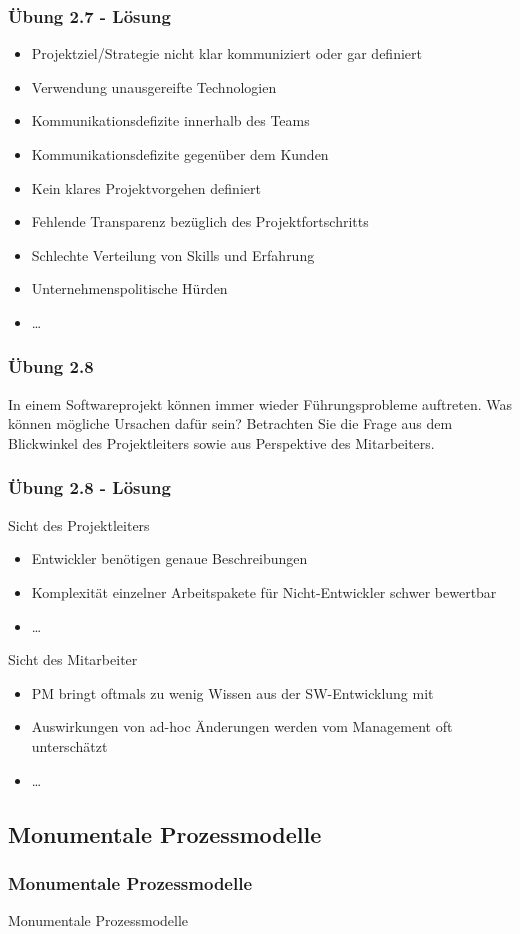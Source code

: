 \ifloesung
\begin{frame}[fragile]
\frametitle{Übung 2.7 - Lösung}
	\begin{itemize}
		\item Projektziel/Strategie nicht klar kommuniziert oder gar definiert
		\item Verwendung unausgereifte Technologien
		\item Kommunikationsdefizite innerhalb des Teams
		\item Kommunikationsdefizite gegenüber dem Kunden
		\item Kein klares Projektvorgehen definiert
		\item Fehlende Transparenz bezüglich des Projektfortschritts
		\item Schlechte Verteilung von Skills und Erfahrung
		\item Unternehmenspolitische Hürden
		\item \ldots
	\end{itemize}
\end{frame}
\fi

\begin{frame}
\frametitle{Übung 2.8}
	In einem Softwareprojekt können immer wieder Führungsprobleme auftreten.
	Was können mögliche Ursachen dafür sein? Betrachten Sie die Frage aus dem
	Blickwinkel des Projektleiters sowie aus Perspektive des Mitarbeiters.
\end{frame}

\ifloesung
\begin{frame}[fragile]
\frametitle{Übung 2.8 - Lösung}
	Sicht des Projektleiters
	\begin{itemize}
		\item Entwickler benötigen genaue Beschreibungen
		\item Komplexität einzelner Arbeitspakete für Nicht-Entwickler schwer
		bewertbar
		\item \ldots
	\end{itemize}
	\bigskip
	Sicht des Mitarbeiter
	\begin{itemize}
		\item PM bringt oftmals zu wenig Wissen aus der SW-Entwicklung
		mit
		\item Auswirkungen von ad-hoc Änderungen werden vom Management oft
		unterschätzt
		\item \ldots
	\end{itemize}
\end{frame}
\fi

\subsection{Monumentale Prozessmodelle}
\begin{frame}
\frametitle{Monumentale Prozessmodelle}
\huge Monumentale Prozessmodelle
\end{frame}


